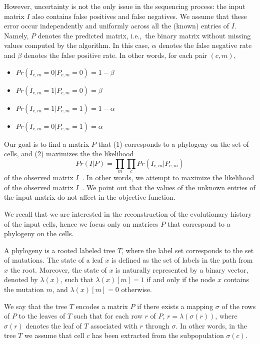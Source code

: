 \documentclass[a4paper,USenglish]{article}
\newcommand{\ie}{i.e.,~}
\theoremstyle{definition}
\begin{document}
However, uncertainty is not the only issue in the sequencing process:
the input matrix $I$ also contains false positives and false negatives. 
We assume that these error occur independently and uniformly across 
all the (known) entries of $I$. 
Namely, $P$ denotes the predicted matrix, \ie the binary matrix without
missing values computed by the algorithm.
In this case,
$\alpha$ denotes the false negative rate and $\beta$ denotes the false positive rate.
In other words, for each pair $(c,m)$, 
\begin{itemize}
    \item $Pr(I_{c,m} = 0|P_{c,m} = 0) = 1- \beta$
    \item $Pr(I_{c,m} = 1|P_{c,m} = 0) = \beta$
    \item $Pr(I_{c,m} = 1|P_{c,m} = 1) = 1- \alpha$
    \item $Pr(I_{c,m} = 0|P_{c,m} = 1) = \alpha$
\end{itemize}

Our goal is to find a matrix $P$ that (1) corresponds to a phylogeny on the set of cells,
and (2) maximizes the the likelihood 
$$
Pr(I|P) = \prod_{m} \prod_{c} Pr(I_{c,m}|P_{c,m})
$$
of the observed matrix $I$~\cite{Jahn2016}.
In other words, we attempt to maximize the likelihood of the observed matrix $I$~\cite{Jahn2016}.
We point out that the values of the unknown entries of the input matrix 
do not affect in the objective function.

We recall that we are interested in the reconstruction of the evolutionary history 
of the input cells, hence we focus only on matrices $P$ that correspond to a phylogeny on
the cells.

A phylogeny is a rooted labeled tree $T$, where the label set corresponds to the set of mutations.
The state of a leaf $x$ is defined as the set of 
labels in the path from $x$ the root.
Moreover, the state of $x$ is naturally
represented by a binary vector, denoted by $\lambda(x)$, such that $\lambda(x)[m]=1$ if and
only if the node $x$ contains the mutation $m$, and $\lambda(x)[m]=0$ otherwise.

We say that the tree $T$ encodes a matrix $P$ 
if there exists a mapping $\sigma$ of the rows  of $P$
to the leaves of $T$ such that for each row $r$ of $P$, $r=\lambda(\sigma(r))$,
where $\sigma(r)$ denotes the leaf of $T$ associated with $r$ through $\sigma$.
In other words, in the tree $T$ we assume that cell $c$ has been extracted from the
subpopulation $\sigma(c)$.
\end{document}
